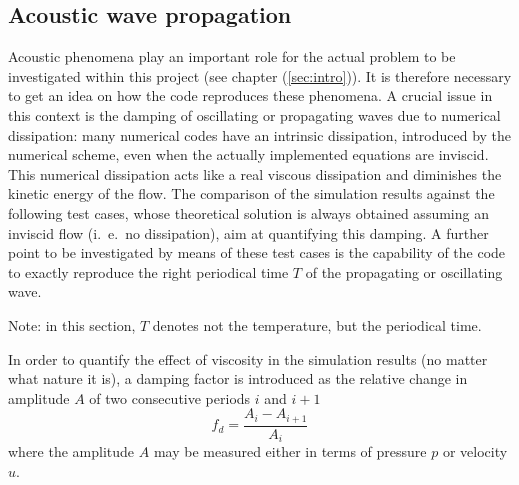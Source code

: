 \documentclass[11pt,a4paper,twoside]{report}
\begin{document}
\subsection{Acoustic wave propagation}
\label{sec:AcousticWavePropagation_GenIntro}
Acoustic phenomena play an important role for the actual problem to be investigated within this project (see chapter (\ref{sec:intro})). It is therefore necessary to get an idea on how the code reproduces these phenomena. A crucial issue in this context is the damping of oscillating or propagating waves due to numerical dissipation: many numerical codes have an intrinsic dissipation, introduced by the numerical scheme, even when the actually implemented equations are inviscid. This numerical dissipation acts like a real viscous dissipation and diminishes the kinetic energy of the flow. The comparison of the simulation results against the following test cases, whose theoretical solution is always obtained assuming an inviscid flow (i.\ e.\ no dissipation), aim at quantifying this damping. A further point to be investigated by means of these test cases is the capability of the code to exactly reproduce the right periodical time $T$ of the propagating or oscillating wave.

Note: in this section, $T$ denotes not the temperature, but the periodical time. 

 
In order to quantify the effect of viscosity in the simulation results (no matter what nature it is), a damping factor
is introduced as the relative change in amplitude $A$ of two consecutive periods $i$ and $i+1$
\begin{equation}
\label{eq:DampingFactor}
 f_d=\frac{A_i-A_{i+1}}{A_i}
\end{equation}
where the amplitude $A$ may be measured either in terms of pressure $p$ or velocity $u$.

\end{document}
